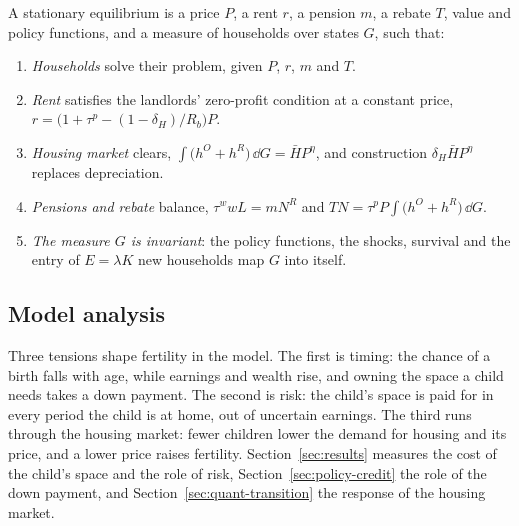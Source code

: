 \begin{definition}
A stationary equilibrium is a price $P$, a rent $r$, a pension $m$, a rebate
$T$, value and policy functions, and a measure of households over states
$G$, such that:
\begin{enumerate}
\item \emph{Households} solve their problem, given $P$, $r$, $m$ and $T$.
\item \emph{Rent} satisfies the landlords' zero-profit condition at a
constant price, $r=\bigl(1+\tau^p-(1-\delta_H)/R_b\bigr)P$.
\item \emph{Housing market} clears,
$\int\bigl(h^O+h^R\bigr)\,\dd G=\bar HP^{\eta}$, and construction $\delta_H\bar HP^{\eta}$ replaces depreciation.
\item \emph{Pensions and rebate} balance, $\tau^wwL=mN^R$ and
$TN=\tau^pP\int\bigl(h^O+h^R\bigr)\,\dd G$.
\item \emph{The measure $G$ is invariant}: the policy functions, the shocks,
survival and the entry of $E=\lambda K$ new households map $G$ into itself.
\end{enumerate}
\end{definition}

\subsection{Model analysis}
\label{sec:m-analysis}

Three tensions shape fertility in the model. The first is timing: the chance
of a birth falls with age, while earnings and wealth rise, and owning the
space a child needs takes a down payment. The second is risk: the child's
space is paid for in every period the child is at home, out of uncertain
earnings. The third runs through the housing market: fewer children lower the
demand for housing and its price, and a lower price raises fertility.
Section~\ref{sec:results} measures the cost of the child's space and the role
of risk, Section~\ref{sec:policy-credit} the role of the down payment, and
Section~\ref{sec:quant-transition} the response of the housing market.

